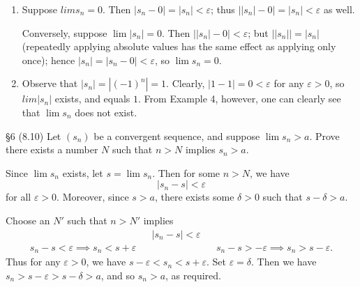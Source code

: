 \documentclass{homework}
\begin{document}
\begin{solution}
  \begin{enumerate}[label=(\alph*)]
    \item Suppose $lim{s_n}=0$. Then $\left| s_n-0 \right| =\left| s_n \right| <\varepsilon$; thus
      $\left| \left| s_n \right| -0 \right| =\left| s_n \right| <\varepsilon$ as well.

      Conversely, suppose $\lim{\left| s_n \right|}=0$. Then $\left| \left| s_n \right| -0
      \right|<\varepsilon $; but $\left| \left| s_n \right|  \right| =\left| s_n \right|$
      (repeatedly applying absolute values has the same effect as applying only once); hence $\left|
      s_n \right| =\left| s_n-0 \right| <\varepsilon$, so $\lim{s_n}=0$.
    \item Observe that $ \left| s_n \right| =\left| (-1)^{n} \right| =1$. Clearly, $\left| 1-1
      \right| =0<\varepsilon$ for any $\varepsilon>0$, so $lim{\left| s_n \right| }$ exists, and
      equals $1$. From Example 4, however, one can clearly see that $\lim{s_n}$ does not exist.
  \end{enumerate}
\end{solution}

\begin{problem}{\S 6}
  (8.10) Let $(s_n)$ be a convergent sequence, and suppose $\lim{s_n}>a$. Prove there exists a
  number $N$ such that $n>N$ implies $s_n >a$.
\end{problem}

\begin{solution}
  Since $\lim{s_n}$ exists, let $s=\lim{s_n}$. Then for some $n>N$, we have \[
    \left| s_n-s \right| <\varepsilon
  \] for all $\varepsilon>0$. Moreover, since $s>a$, there exists some $\delta>0$ such that
  $s-\delta>a$. 

  Choose an $N'$ such that $n>N'$ implies
  \begin{align*}
    && \left| s_n-s \right| <\varepsilon&&\\
    s_n-s<\varepsilon \implies s_n<s+\varepsilon&& &&s_n-s>-\varepsilon\implies s_n>s-\varepsilon
  .\end{align*}
  Thus for any $\varepsilon>0$, we have $s-\varepsilon<s_n<s+\varepsilon$. Set $\varepsilon=\delta$.
  Then we have $s_n>s-\varepsilon>s-\delta>a$, and so $s_n>a$, as required.
\end{solution}
\end{document}
